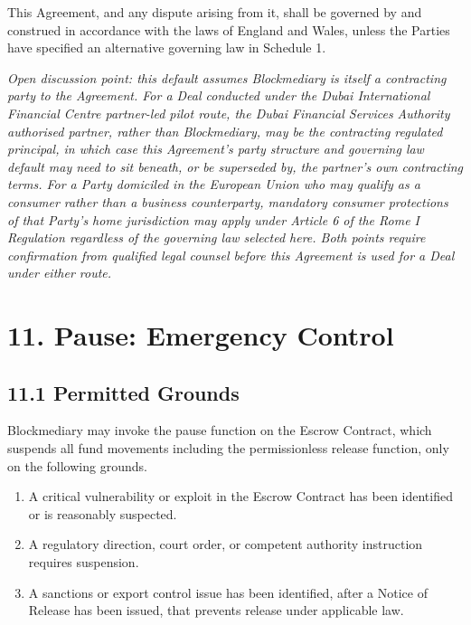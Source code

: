 \documentclass[12pt, a4paper]{article}
\begin{document}
This Agreement, and any dispute arising from it, shall be governed by and construed in
accordance with the laws of England and Wales, unless the Parties have specified an
alternative governing law in Schedule 1.

\textit{Open discussion point: this default assumes Blockmediary is itself a contracting
party to the Agreement. For a Deal conducted under the Dubai International Financial
Centre partner-led pilot route, the Dubai Financial Services Authority authorised partner,
rather than Blockmediary, may be the contracting regulated principal, in which case this
Agreement's party structure and governing law default may need to sit beneath, or be
superseded by, the partner's own contracting terms. For a Party domiciled in the European
Union who may qualify as a consumer rather than a business counterparty, mandatory
consumer protections of that Party's home jurisdiction may apply under Article 6 of the
Rome I Regulation regardless of the governing law selected here. Both points require
confirmation from qualified legal counsel before this Agreement is used for a Deal under
either route.}

\section*{11. Pause: Emergency Control}

\subsection*{11.1 Permitted Grounds}

Blockmediary may invoke the pause function on the Escrow Contract, which suspends all fund
movements including the permissionless release function, only on the following grounds.

\begin{enumerate}[label=(\alph*)]
\item A critical vulnerability or exploit in the Escrow Contract has been identified or is
reasonably suspected.
\item A regulatory direction, court order, or competent authority instruction requires
suspension.
\item A sanctions or export control issue has been identified, after a Notice of Release
has been issued, that prevents release under applicable law.
\end{enumerate}
\end{document}
